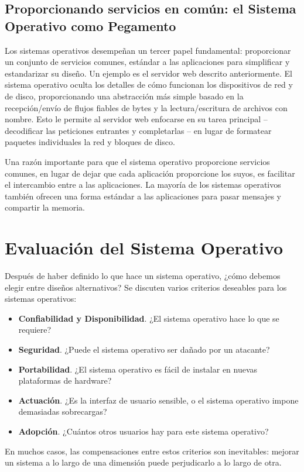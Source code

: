\documentclass[10pt]{book}
\begin{document}
\subsection{Proporcionando servicios en común: el Sistema Operativo como Pegamento}
Los sistemas operativos desempeñan un tercer papel fundamental: proporcionar un conjunto de servicios comunes, estándar a las aplicaciones para simplificar y estandarizar su diseño. Un ejemplo es el servidor web descrito anteriormente. El sistema operativo oculta los detalles de cómo funcionan los dispositivos de red y de disco, proporcionando una abstracción más simple basado en la recepción/envío de flujos fiables de bytes y la lectura/escritura de archivos con nombre. Esto le permite al servidor web enfocarse en su tarea principal -- decodificar las peticiones entrantes y completarlas -- en lugar de formatear paquetes individuales la red y bloques de disco.

Una razón importante para que el sistema operativo proporcione servicios comunes, en lugar de dejar que cada aplicación proporcione los suyos, es facilitar el intercambio entre a las aplicaciones. La mayoría de los sistemas operativos también ofrecen una forma estándar a las aplicaciones para pasar mensajes y compartir la memoria.


\section{Evaluación del Sistema Operativo}
Después de haber definido lo que hace un sistema operativo, ¿cómo debemos elegir entre diseños alternativos? Se discuten varios criterios deseables para los sistemas operativos:
\begin{itemize}
\item \textbf{Confiabilidad y Disponibilidad}. ¿El sistema operativo hace lo que se requiere?
\item \textbf{Seguridad}. ¿Puede el sistema operativo ser dañado por un atacante?
\item \textbf{Portabilidad}. ¿El sistema operativo es fácil de instalar en nuevas plataformas de hardware?
\item \textbf{Actuación}. ¿Es la interfaz de usuario sensible, o el sistema operativo impone demasiadas sobrecargas?
\item \textbf{Adopción}. ¿Cuántos otros usuarios hay para este sistema operativo?
\end{itemize}

En muchos casos, las compensaciones entre estos criterios son inevitables: mejorar un sistema a lo largo de una dimensión puede perjudicarlo a lo largo de otra.
\end{document}
